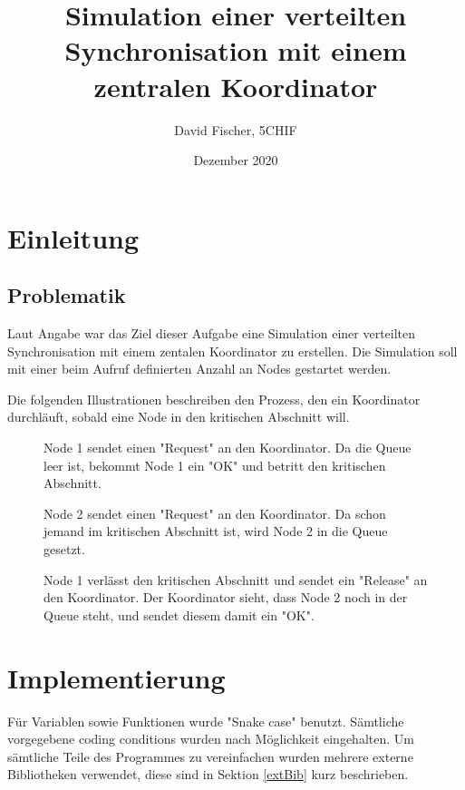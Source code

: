 \documentclass[12pt, letterpaper]{article}
\title{Simulation einer verteilten Synchronisation mit einem zentralen Koordinator}
\author{David Fischer, 5CHIF}
\date{Dezember 2020}
\begin{document}
\begin{titlepage}
\maketitle
\end{titlepage}

\tableofcontents
\newpage

\section{Einleitung}

\subsection{Problematik}
Laut Angabe war das Ziel dieser Aufgabe eine Simulation einer verteilten Synchronisation mit einem zentalen Koordinator zu erstellen. Die Simulation soll mit einer beim Aufruf definierten Anzahl an Nodes gestartet werden.

Die folgenden Illustrationen beschreiben den Prozess, den ein Koordinator durchläuft, sobald eine Node in den kritischen Abschnitt will.

\begin{figure}[H]
    \centering
    \resizebox{0.4\textwidth}{!}{}
    \caption{Node 1 sendet einen "Request" an den Koordinator. Da die Queue leer ist, bekommt Node 1 ein "OK" und betritt den kritischen Abschnitt.}
    \label{fig:situation1}
\end{figure}

\begin{figure}[H]
    \centering
    \resizebox{0.4\textwidth}{!}{}
    \caption{Node 2 sendet einen "Request" an den Koordinator. Da schon jemand im kritischen Abschnitt ist, wird Node 2 in die Queue gesetzt.}
    \label{fig:situation2}
\end{figure}


\begin{figure}[H]
    \centering
    \resizebox{0.4\textwidth}{!}{}
    \caption{Node 1 verlässt den kritischen Abschnitt und sendet ein "Release" an den Koordinator. Der Koordinator sieht, dass Node 2 noch in der Queue steht, und sendet diesem damit ein "OK". }
    \label{fig:situation3}
\end{figure}

\section{Implementierung}
Für Variablen sowie Funktionen wurde "Snake case" benutzt. Sämtliche vorgegebene coding conditions wurden nach Möglichkeit eingehalten. Um sämtliche Teile des Programmes zu vereinfachen wurden mehrere externe Bibliotheken verwendet, diese sind in Sektion \ref{extBib} kurz beschrieben. 
\end{document}
